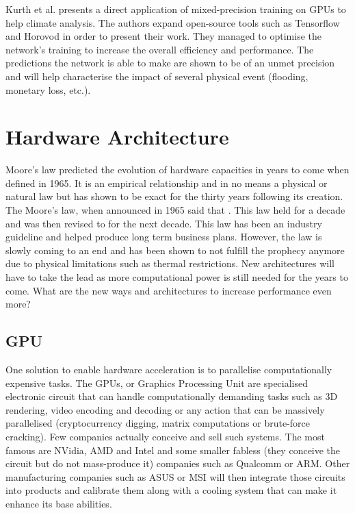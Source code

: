 Kurth et al. \cite{Kurth2018} presents a direct application of mixed-precision training on GPUs to help climate analysis. The authors expand open-source tools such as Tensorflow and Horovod in order to present their work. They managed to optimise the network's training to increase the overall efficiency and performance. The predictions the network is able to make are shown to be of an unmet precision and will help characterise the impact of several physical event (flooding, monetary loss, etc.).


\section{Hardware Architecture}

Moore's law \cite{Moore2006} predicted the evolution of hardware capacities in years to come when defined in 1965. It is an empirical relationship and in no means a physical or natural law but has shown to be exact for the thirty years following its creation. The Moore's law, when announced in 1965 said that . This law held for a decade and was then revised to  for the next decade. This law has been an industry guideline and helped produce long term business plans. However, the law is slowly coming to an end and has been shown to not fulfill the prophecy anymore due to physical limitations such as thermal restrictions. New architectures will have to take the lead as more computational power is still needed for the years to come. What are the new ways and architectures to increase performance even more?


\subsection{GPU}

One solution to enable hardware acceleration is to parallelise computationally expensive tasks. The GPUs, or Graphics Processing Unit are specialised electronic circuit that can handle computationally demanding tasks such as 3D rendering, video encoding and decoding or any action that can be massively parallelised (cryptocurrency digging, matrix computations or brute-force cracking). Few companies actually conceive and sell such systems. The most famous are NVidia, AMD and Intel and some smaller fabless (they conceive the circuit but do not mass-produce it) companies such as Qualcomm or ARM. Other manufacturing companies such as ASUS or MSI will then integrate those circuits into products and calibrate them along with a cooling system that can make it enhance its base abilities.

